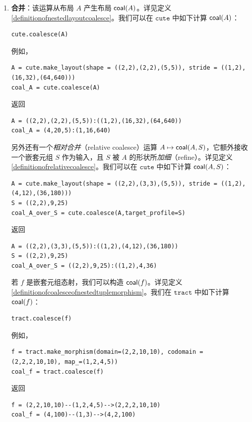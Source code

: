 \begin{enumerate}[left=0pt]
\item {\bf 合并}：该运算从布局 $A$ 产生布局 $\mathsf{coal}(A)$。详见定义 \ref{definitionofnestedlayoutcoalesce}。我们可以在 $\texttt{cute}$ 中如下计算 $\mathsf{coal}(A)$：
\begin{lstlisting}[language=cutedsl]
cute.coalesce(A)
\end{lstlisting}
例如，
\begin{lstlisting}[language=cutedsl]
A = cute.make_layout(shape = ((2,2),(2,2),(5,5)), stride = ((1,2),(16,32),(64,640)))
coal_A = cute.coalesce(A)
\end{lstlisting}
返回
\begin{lstlisting}[language=cutedsl]
A = ((2,2),(2,2),(5,5)):((1,2),(16,32),(64,640))
coal_A = (4,20,5):(1,16,640)
\end{lstlisting}
另外还有一个{\it 相对合并}（relative coalesce）运算 $A \mapsto \mathsf{coal}(A,S)$，它额外接收一个嵌套元组 $S$ 作为输入，且 $S$ 被 $A$ 的形状所{\it 加细}（refine）。详见定义 \ref{definitionofrelativecoalesce}。我们可以在 $\texttt{cute}$ 中如下计算 $\mathsf{coal}(A,S)$：
\begin{lstlisting}[language=cutedsl]
A = cute.make_layout(shape = ((2,2),(3,3),(5,5)), stride = ((1,2),(4,12),(36,180)))
S = ((2,2),9,25)
coal_A_over_S = cute.coalesce(A,target_profile=S)
\end{lstlisting}
返回
\begin{lstlisting}[language=cutedsl]
A = ((2,2),(3,3),(5,5)):((1,2),(4,12),(36,180))
S = ((2,2),9,25)
coal_A_over_S = ((2,2),9,25):((1,2),4,36)
\end{lstlisting}
若 $f$ 是嵌套元组态射，我们可以构造 $\mathsf{coal}(f)$。详见定义 \ref{definitionofcoalesceofnestedtuplemorphism}。我们在 $\texttt{tract}$ 中如下计算 $\mathsf{coal}(f)$：
\begin{lstlisting}[language=cutedsl]
tract.coalesce(f)
\end{lstlisting}
例如，
\begin{lstlisting}[language=cutedsl]
f = tract.make_morphism(domain=(2,2,10,10), codomain = (2,2,2,10,10), map_=(1,2,4,5))
coal_f = tract.coalesce(f)
\end{lstlisting}
返回
\begin{lstlisting}[language=cutedsl]
f = (2,2,10,10)--(1,2,4,5)-->(2,2,2,10,10)
coal_f = (4,100)--(1,3)-->(4,2,100)
\end{lstlisting}


\end{enumerate}
